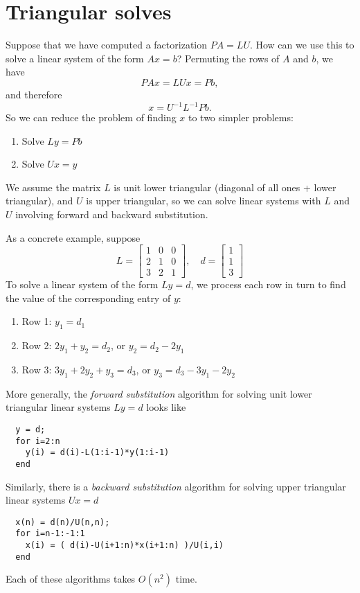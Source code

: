 \documentclass[12pt, leqno]{article} %
\begin{document}
\section{Triangular solves}

Suppose that we have computed a factorization $PA = LU$.  How can we
use this to solve a linear system of the form $Ax = b$?  Permuting the
rows of $A$ and $b$, we have
\[
  PAx = LUx = Pb,
\]
and therefore
\[
  x = U^{-1} L^{-1} Pb.
\]
So we can reduce the problem of finding $x$ to two simpler problems:
\begin{enumerate}
\item
  Solve $Ly = Pb$
\item
  Solve $Ux = y$
\end{enumerate}
We assume the matrix $L$ is unit lower triangular (diagonal of all
ones + lower triangular), and $U$ is upper triangular, so we can solve
linear systems with $L$ and $U$ involving forward and backward
substitution.

As a concrete example, suppose
\[
  L = \begin{bmatrix}
        1 & 0 & 0 \\
        2 & 1 & 0 \\
        3 & 2 & 1
      \end{bmatrix}, \quad
  d = \begin{bmatrix} 1 \\ 1 \\ 3 \end{bmatrix}
\]
To solve a linear system of the form $Ly = d$, we process each row in
turn to find the value of the corresponding entry of $y$:
\begin{enumerate}
\item Row 1:
  $y_1 = d_1$
\item Row 2: $2y_1 + y_2 = d_2$, or $y_2 = d_2 - 2y_1$
\item Row 3: $3y_1 + 2 y_2 + y_3 = d_3$, or $y_3 = d_3 - 3y_1 - 2y_2$
\end{enumerate}
More generally, the {\em forward substitution} algorithm for solving
unit lower triangular linear systems $Ly = d$ looks like
\begin{lstlisting}
  y = d;
  for i=2:n
    y(i) = d(i)-L(1:i-1)*y(1:i-1)
  end
\end{lstlisting}
Similarly, there is a {\em backward substitution} algorithm for
solving upper triangular linear systems $Ux = d$
\begin{lstlisting}
  x(n) = d(n)/U(n,n);
  for i=n-1:-1:1
    x(i) = ( d(i)-U(i+1:n)*x(i+1:n) )/U(i,i)
  end
\end{lstlisting}
Each of these algorithms takes $O(n^2)$ time.
\end{document}

